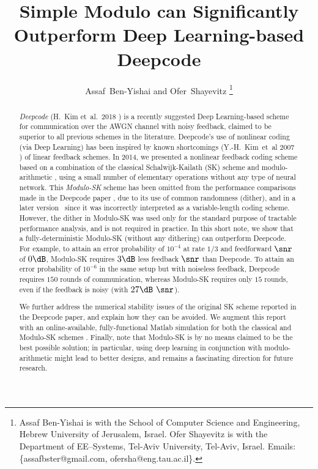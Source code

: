 \title{Simple Modulo can {Significantly} Outperform Deep Learning-based Deepcode}

\author{Assaf~Ben-Yishai and Ofer~Shayevitz
\thanks{
Assaf Ben-Yishai is with the School of Computer Science and Engineering, Hebrew University of Jerusalem, Israel. 
Ofer Shayevitz is with the Department of EE--Systems, Tel-Aviv University, Tel-Aviv, Israel. Emails: \{assafbster@gmail.com, ofersha@eng.tau.ac.il\}.}}

\date{}

\begin{abstract}
\textit{Deepcode} (H.~Kim et~al.~2018 \cite{kim2018deepcode}) is a recently suggested Deep Learning-based scheme for communication over the AWGN channel with noisy feedback, claimed to be superior to all previous schemes in the literature. Deepcode's use of nonlinear coding (via Deep Learning) has been inspired by known shortcomings (Y.-H.~Kim~et~al 2007 \cite{Kim2007}) of linear feedback schemes. In 2014, we presented a nonlinear feedback coding scheme based on a combination of the classical Schalwijk-Kailath (SK) scheme and modulo-arithmetic \cite{SimpleInteractionAllerton2014}, using a small number of elementary operations without any type of neural network. This \textit{Modulo-SK} scheme has been omitted from the performance comparisons made in the Deepcode paper \cite{kim2018deepcode}, due to its use of common randomness (dither), and in a later version~\cite{DeepcodeIEEE} since it was incorrectly interpreted as a variable-length coding scheme. However, the dither in Modulo-SK was used only for the standard purpose of tractable performance analysis, and is not required in practice. In this short note, we show that a fully-deterministic Modulo-SK (without any dithering) can outperform Deepcode. For example, to attain an error probability of $10^{-4}$ at rate $1/3$ and feedforward $\snr$ of $0\dB$, Modulo-SK requires $3\dB$ less feedback $\snr$ than Deepcode. To attain an error probability of $10^{-6}$ in the same setup but with noiseless feedback, Deepcode requires $150$ rounds of communication, whereas Modulo-SK requires only $15$ rounds, even if the feedback is noisy (with $27\dB$ $\snr$). 

We further address the numerical stability issues of the original SK scheme reported in the Deepcode paper, and explain how they can be avoided. We augment this report with an online-available, fully-functional Matlab simulation for both the classical and Modulo-SK schemes \cite{ModuloSKcode}. Finally, note that Modulo-SK is by no means claimed to be the best possible solution; in particular, using deep learning in conjunction with modulo-arithmetic might lead to better designs, and remains a fascinating direction for future research. 
\end{abstract}
\nocite{DeepcodeNIPS}

